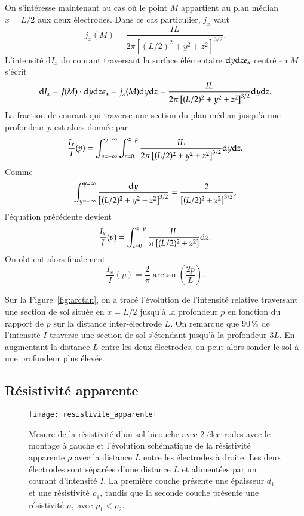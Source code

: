 On s'intéresse maintenant au cas où le point $M$ appartient au plan médian $
x = L/2$ aux
deux électrodes. Dans ce cas particulier, $j_x$ vaut
\begin{equation*}
	j_x(M) = \dfrac{IL}{2 \pi \left[(L/2)^2 + y^2 + z^2\right]^{3/2}}.
\end{equation*}
L'intensité $\mathrm{d}I_x$ du courant traversant la surface 
élémentaire $\dy\dz \ex$ centré en $M$ s'écrit
\begin{equation*}
	\mathrm{d}I_x = \vecj(M) \cdot \dy\dz\ex = j_x(M) \dy\dz
	    = \dfrac{IL}{2 \pi \left[(L/2)^2 + y^2 + z^2\right]^{3/2}} \dy\dz.
\end{equation*}
La fraction de courant qui traverse une section du plan médian jusqu'à une 
profondeur $p$ est alors donnée par
\begin{equation*}
	\dfrac{I_x}{I}(p) = \int_{y=-\infty}^{y=\infty} \int_{z=0}^{z=p}
	\dfrac{IL}{2 \pi \left[(L/2)^2 + y^2 + z^2\right]^{3/2}} \mathrm{d}y\mathrm{d}z.
\end{equation*}
Comme 
	\begin{equation*}
		\int_{y=-\infty}^{y=\infty} \dfrac{\mathrm{d}y}{
			\left[(L/2)^2 + y^2 + z^2\right]^{3/2}} = 
		\dfrac{2}{\left[(L/2)^2 + z^2\right]^{3/2}},
	\end{equation*}
l'équation précédente devient
\begin{equation*}
	\dfrac{I_x}{I}(p) = \int_{z=0}^{z=p}
	\dfrac{IL}{\pi \left[(L/2)^2 + z^2\right]} \mathrm{d}z.
\end{equation*}
On obtient alors finalement
\begin{equation}
	\dfrac{I_x}{I}(p) = \dfrac{2}{\pi}\arctan\left(\dfrac{2p}{L}\right).
\end{equation}

Sur la Figure~\ref{fig:arctan}, on a tracé l'évolution de l'intensité relative traversant
une section de sol située en $x = L/2$ 
jusqu'à la profondeur $p$ en fonction du rapport de $p$ sur 
la distance inter-électrode $L$. 
On remarque que $90\,\%$ de l'intensité $I$ traverse une section de sol s'étendant
jusqu'à la profondeur $3L$. En augmentant la distance $L$ entre les deux électrodes,
on peut alors sonder le sol à une profondeur plus élevée.

\subsection{Résistivité apparente}
\begin{figure}[t]
	\centering
	\texttt{[image: resistivite\_apparente]}
	\caption{Mesure de la résistivité d'un sol bicouche avec 2 électrodes
		avec le montage à gauche et l'évolution schématique de la résistivité
		apparente $\rho$ avec la distance $L$ entre les électrodes à droite.
		Les deux électrodes sont séparées d'une distance $L$ et 
		alimentées par un courant d'intensité $I$. La première couche 
		présente une épaisseur $d_1$ et une résistivité $\rho_1$, tandis
		que la seconde couche présente une résistivité 
		$\rho_2$ avec $\rho_1 < \rho_2$.}%
	\label{fig:apparente}
\end{figure}

